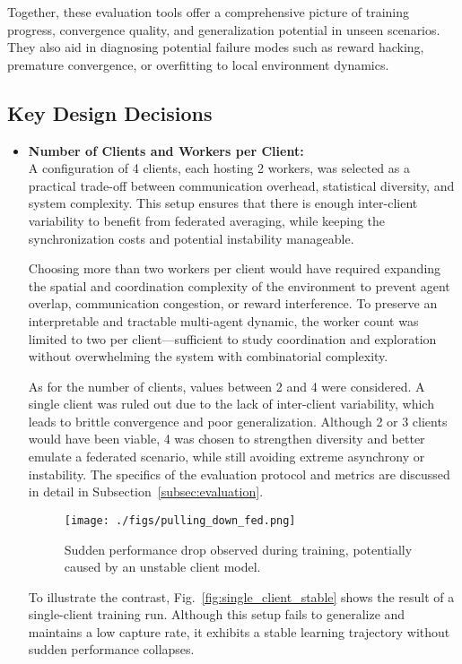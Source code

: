 \documentclass[12pt,a4paper,twoside,openany]{book}
\begin{document}
Together, these evaluation tools offer a comprehensive picture of training progress, convergence quality, and generalization potential in unseen scenarios. They also aid in diagnosing potential failure modes such as reward hacking, premature convergence, or overfitting to local environment dynamics.

\subsection{Key Design Decisions}

\begin{itemize}
\item \textbf{Number of Clients and Workers per Client:} \\
A configuration of 4 clients, each hosting 2 workers, was selected as a practical trade-off between communication overhead, statistical diversity, and system complexity. This setup ensures that there is enough inter-client variability to benefit from federated averaging, while keeping the synchronization costs and potential instability manageable.

Choosing more than two workers per client would have required expanding the spatial and coordination complexity of the environment to prevent agent overlap, communication congestion, or reward interference. To preserve an interpretable and tractable multi-agent dynamic, the worker count was limited to two per client—sufficient to study coordination and exploration without overwhelming the system with combinatorial complexity.

As for the number of clients, values between 2 and 4 were considered. A single client was ruled out due to the lack of inter-client variability, which leads to brittle convergence and poor generalization. Although 2 or 3 clients would have been viable, 4 was chosen to strengthen diversity and better emulate a federated scenario, while still avoiding extreme asynchrony or instability. The specifics of the evaluation protocol and metrics are discussed in detail in Subsection~\ref{subsec:evaluation}.

\begin{figure}[h]
\centering
\texttt{[image: ./figs/pulling\_down\_fed.png]}
\captionsetup{font=small}
\caption{Sudden performance drop observed during training, potentially caused by an unstable client model.}
\label{fig:pulling_down_fed}
\end{figure}


To illustrate the contrast, Fig.~\ref{fig:single_client_stable} shows the result of a single-client training run. Although this setup fails to generalize and maintains a low capture rate, it exhibits a stable learning trajectory without sudden performance collapses.


\end{itemize}
\end{document}
